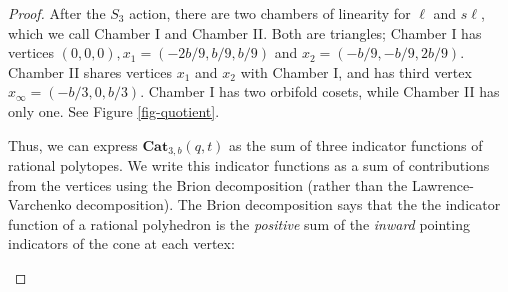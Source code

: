 \documentclass{amsart}[12pt]
\theoremstyle{definition}
\newcommand{\Cat}{\mathbf{Cat}}
\newcommand{\sk}{s\ell}
\begin{document}
\begin{proof}
After the $S_3$ action, there are two chambers of linearity for $\ell$ and $\sk$, which we call Chamber I and Chamber II.  Both are triangles; Chamber I has vertices $(0,0,0), x_1=(-2b/9, b/9, b/9)$ and $x_2=(-b/9, -b/9, 2b/9)$.  Chamber II shares vertices $x_1$ and $x_2$ with Chamber I, and has third vertex $x_\infty=(-b/3,0,b/3)$.  Chamber I has two orbifold cosets, while Chamber II has only one.  See Figure \ref{fig-quotient}.  

Thus, we can express $\Cat_{3,b}(q,t)$ as the sum of three indicator functions of rational polytopes.  We write this indicator functions as a sum of contributions from the vertices using the Brion decomposition (rather than the Lawrence-Varchenko decomposition).  The Brion decomposition says that the the indicator function of a rational polyhedron is the \emph{positive} sum of the \emph{inward} pointing indicators of the cone at each vertex:

\begin{center}
\end{center}
\end{proof}
\end{document}
